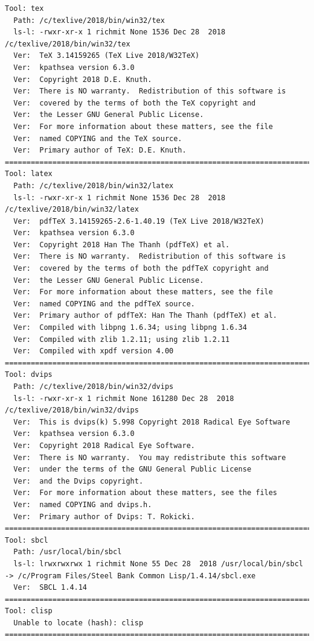 \documentclass[11pt]{article}
\begin{document}
\begin{verbatim}
Tool: tex
  Path: /c/texlive/2018/bin/win32/tex
  ls-l: -rwxr-xr-x 1 richmit None 1536 Dec 28  2018 /c/texlive/2018/bin/win32/tex
  Ver:  TeX 3.14159265 (TeX Live 2018/W32TeX)
  Ver:  kpathsea version 6.3.0
  Ver:  Copyright 2018 D.E. Knuth.
  Ver:  There is NO warranty.  Redistribution of this software is
  Ver:  covered by the terms of both the TeX copyright and
  Ver:  the Lesser GNU General Public License.
  Ver:  For more information about these matters, see the file
  Ver:  named COPYING and the TeX source.
  Ver:  Primary author of TeX: D.E. Knuth.
==========================================================================================
Tool: latex
  Path: /c/texlive/2018/bin/win32/latex
  ls-l: -rwxr-xr-x 1 richmit None 1536 Dec 28  2018 /c/texlive/2018/bin/win32/latex
  Ver:  pdfTeX 3.14159265-2.6-1.40.19 (TeX Live 2018/W32TeX)
  Ver:  kpathsea version 6.3.0
  Ver:  Copyright 2018 Han The Thanh (pdfTeX) et al.
  Ver:  There is NO warranty.  Redistribution of this software is
  Ver:  covered by the terms of both the pdfTeX copyright and
  Ver:  the Lesser GNU General Public License.
  Ver:  For more information about these matters, see the file
  Ver:  named COPYING and the pdfTeX source.
  Ver:  Primary author of pdfTeX: Han The Thanh (pdfTeX) et al.
  Ver:  Compiled with libpng 1.6.34; using libpng 1.6.34
  Ver:  Compiled with zlib 1.2.11; using zlib 1.2.11
  Ver:  Compiled with xpdf version 4.00
==========================================================================================
Tool: dvips
  Path: /c/texlive/2018/bin/win32/dvips
  ls-l: -rwxr-xr-x 1 richmit None 161280 Dec 28  2018 /c/texlive/2018/bin/win32/dvips
  Ver:  This is dvips(k) 5.998 Copyright 2018 Radical Eye Software
  Ver:  kpathsea version 6.3.0
  Ver:  Copyright 2018 Radical Eye Software.
  Ver:  There is NO warranty.  You may redistribute this software
  Ver:  under the terms of the GNU General Public License
  Ver:  and the Dvips copyright.
  Ver:  For more information about these matters, see the files
  Ver:  named COPYING and dvips.h.
  Ver:  Primary author of Dvips: T. Rokicki.
==========================================================================================
Tool: sbcl
  Path: /usr/local/bin/sbcl
  ls-l: lrwxrwxrwx 1 richmit None 55 Dec 28  2018 /usr/local/bin/sbcl -> /c/Program Files/Steel Bank Common Lisp/1.4.14/sbcl.exe
  Ver:  SBCL 1.4.14
==========================================================================================
Tool: clisp
  Unable to locate (hash): clisp
==========================================================================================

\end{verbatim}
\end{document}
